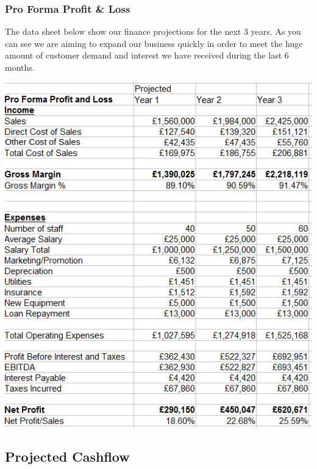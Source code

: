 \documentclass{article}
\begin{document}
\subsubsection{Pro Forma Profit \& Loss}

The data sheet below show our finance projections for the next 3 years. As you can see we are aiming to expand our business quickly in order to meet the huge amount of customer demand and interest we have received during the last 6 months. \\
\begin{center}
\includegraphics[scale=1.0]{proFormaProfit3Years.png}
\end{center}

\pagebreak

\subsection{Projected Cashflow}
\end{document}
